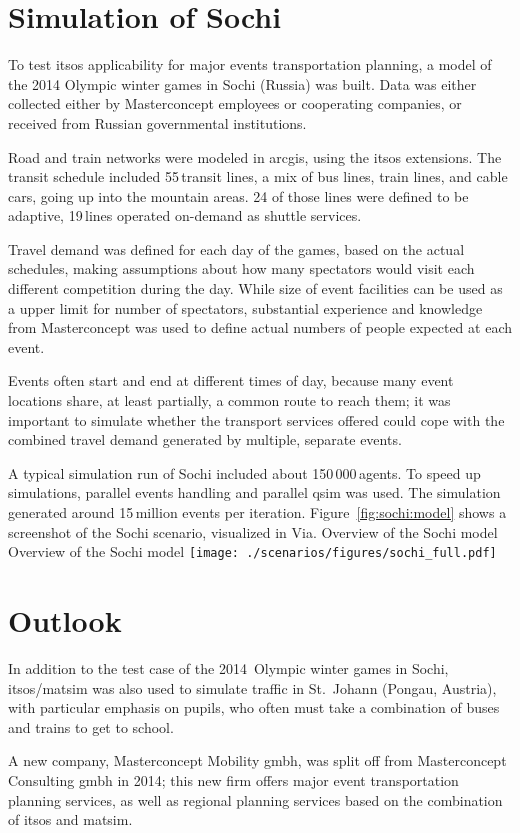 \section{Simulation of Sochi}
To test \gls{itsos} applicability for major events transportation planning,
a model of the 2014 Olympic winter games in Sochi (Russia) was built. Data was
either collected either by Masterconcept employees or cooperating companies, or
received from Russian governmental institutions.

Road and train networks were modeled in \gls{arcgis}, using the \gls{itsos} extensions.
The transit schedule included 55\,transit lines, a mix of bus lines, train lines,
and cable cars, going up into the mountain areas. 24 of those lines were
defined to be adaptive, 19\,lines operated on-demand as shuttle services.

Travel demand was defined for each day of the games, based on the actual schedules,
making assumptions about how many spectators would visit each different
competition during the day. While size of event facilities can be used as a
upper limit for number of spectators, substantial experience and knowledge from
Masterconcept was used to define actual numbers of people expected at each
event.

Events often start and end at different times of day, because many event locations share, at least partially, a
common route to reach them; it was important to simulate whether the transport services offered could
cope with the combined travel demand generated by multiple, separate events.

A typical simulation run of Sochi included about 150\,000\,agents. To speed up simulations, parallel events handling and parallel qsim was used. The simulation generated around 15\,million events per iteration.
%
Figure~\ref{fig:sochi:model} shows a screenshot of the Sochi scenario, visualized in Via.
%
\createfigure%
{Overview of the Sochi model}%
{Overview of the Sochi model}%
{\label{fig:sochi:model}}%
{\texttt{[image: ./scenarios/figures/sochi\_full.pdf]}}%
{}
%

\section{Outlook}
In addition to the test case of the 2014~Olympic winter games in Sochi, \gls{itsos}/\gls{matsim}
was also used to simulate traffic in St.\ Johann (Pongau, Austria), with particular 
emphasis on pupils, who often must take a combination of buses and trains to
get to school.

A new company, Masterconcept Mobility \gls{gmbh}, was split off from Masterconcept Consulting \gls{gmbh} in 2014; 
this new firm offers major event transportation planning services, as well as regional planning services 
based on the combination of \gls{itsos} and \gls{matsim}.

